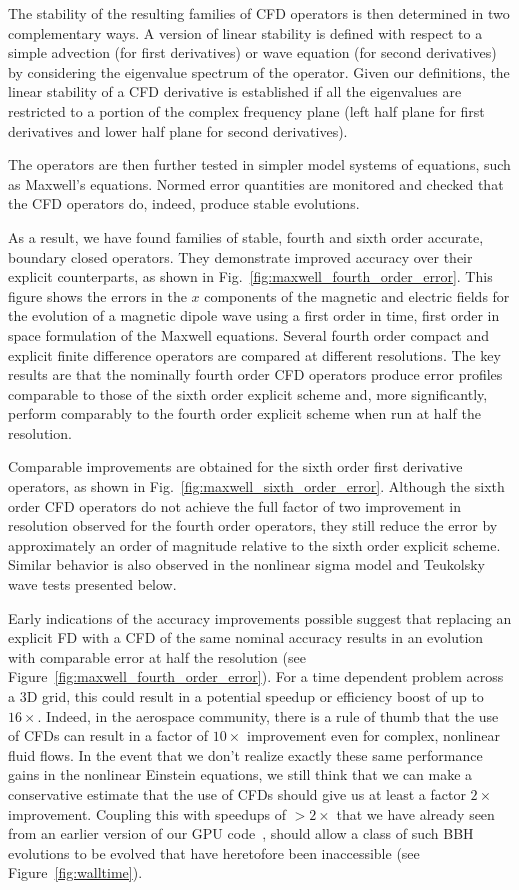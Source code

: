 The stability of the resulting families of CFD operators is then determined
in two complementary ways.  A version of linear stability is defined with
respect to a simple advection (for first derivatives) or wave equation (for
second derivatives)
by considering the eigenvalue spectrum of the operator.
Given our definitions, the linear stability of a CFD derivative is established
if all the eigenvalues are restricted to a portion of the complex frequency
plane (left half plane for first derivatives and lower half plane for second
derivatives).

The operators are then further tested in  simpler
model systems of equations, such as Maxwell's equations.
Normed error quantities
are monitored and checked that the CFD operators do, indeed, produce stable
evolutions.

As a result, we have found families of stable, fourth and sixth order accurate,
boundary closed operators. They demonstrate improved accuracy over their
explicit counterparts, as shown in
Fig.~\ref{fig:maxwell_fourth_order_error}. This figure shows the errors in the
$x$ components of the magnetic and electric fields for the evolution of a
magnetic dipole wave using a first order in time, first order in space
formulation of the Maxwell equations. Several fourth order compact and
explicit finite difference operators are compared at different resolutions.
The key results are that the nominally fourth order CFD operators produce
error profiles comparable to those of the sixth order explicit scheme and,
more significantly, perform comparably to the fourth order explicit scheme
when run at half the resolution.

Comparable improvements are obtained for the sixth order first derivative
operators, as shown in Fig.~\ref{fig:maxwell_sixth_order_error}. Although the
sixth order CFD operators do not achieve the full factor of two improvement
in resolution observed for the fourth order operators, they still reduce the
error by approximately an order of magnitude relative to the sixth order
explicit scheme. Similar behavior is also observed in the nonlinear sigma
model and Teukolsky wave tests presented below.

Early indications of the accuracy improvements possible suggest that replacing an
explicit FD with a CFD of the same nominal accuracy results in an evolution with
comparable error at half the resolution (see Figure~\ref{fig:maxwell_fourth_order_error}).  For a time dependent problem across a 3D grid, this could result in
a potential speedup or efficiency boost of up to $16\times$.  Indeed, in the aerospace community, there is a rule of thumb that the use of CFDs can result in a factor of $10\times$ improvement even for complex, nonlinear fluid flows.  In the event that we don't realize
exactly these same performance gains in the nonlinear Einstein equations, we still think that we can make a conservative estimate that the use of CFDs should give us at least a factor $2\times$ improvement.  Coupling this with speedups of $> 2\times$ that we have already seen from an earlier version of our GPU code~\cite{Fernando2019}, should
allow a class of such BBH evolutions to be evolved that have heretofore been
inaccessible (see Figure~\ref{fig:walltime}).

